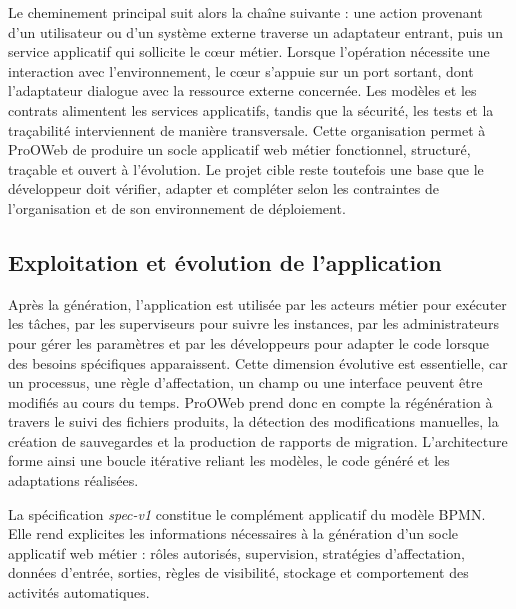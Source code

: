 Le cheminement principal suit alors la chaîne suivante : une action provenant
d'un utilisateur ou d'un système externe traverse un adaptateur entrant, puis un
service applicatif qui sollicite le cœur métier. Lorsque l'opération nécessite
une interaction avec l'environnement, le cœur s'appuie sur un port sortant, dont
l'adaptateur dialogue avec la ressource externe concernée. Les modèles et les
contrats alimentent les services applicatifs, tandis que la sécurité, les tests
et la traçabilité interviennent de manière transversale. Cette organisation
permet à ProOWeb de produire un socle applicatif web métier fonctionnel,
structuré, traçable et ouvert à l'évolution. Le projet cible reste toutefois une
base que le développeur doit vérifier, adapter et compléter selon les contraintes
de l'organisation et de son environnement de déploiement.

\subsection{Exploitation et évolution de l'application}

Après la génération, l'application est utilisée par les acteurs métier pour
exécuter les tâches, par les superviseurs pour suivre les instances, par les
administrateurs pour gérer les paramètres et par les développeurs pour adapter le
code lorsque des besoins spécifiques apparaissent. Cette dimension évolutive est
essentielle, car un processus, une règle d'affectation, un champ ou une interface
peuvent être modifiés au cours du temps. ProOWeb prend donc en compte la
régénération à travers le suivi des fichiers produits, la détection des
modifications manuelles, la création de sauvegardes et la production de rapports
de migration. L'architecture forme ainsi une boucle itérative reliant les modèles,
le code généré et les adaptations réalisées.

\label{sec:chap3-spec}


La spécification \textit{spec-v1} constitue le complément applicatif du modèle BPMN. Elle rend explicites les informations nécessaires à la génération d'un socle applicatif web métier : rôles autorisés, supervision, stratégies d'affectation, données d'entrée, sorties, règles de visibilité, stockage et comportement des activités automatiques.

